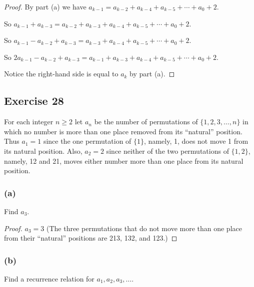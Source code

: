 \documentclass[14pt]{extarticle}
\begin{document}
\begin{proof}
     By part (a) we have \(a_{k-1} = a_{k-2} + a_{k-4} + a_{k-5} + \cdots + a_0 + 2\).

     So \(a_{k-1} + a_{k-3} = a_{k-2} + a_{k-3} + a_{k-4} + a_{k-5} + \cdots + a_0 + 2\).

     So \(a_{k-1} - a_{k-2} + a_{k-3} = a_{k-3} + a_{k-4} + a_{k-5} + \cdots + a_0 + 2\).

     So \(2a_{k-1} - a_{k-2} + a_{k-3} = a_{k-1} + a_{k-3} + a_{k-4} + a_{k-5} + \cdots + a_0 + 2\).

     Notice the right-hand side is equal to \(a_k\) by part (a).
\end{proof}

\subsection{Exercise 28}
For each integer \(n \geq 2\) let \(a_n\) be the number of permutations of \(\{1, 2, 3, \ldots, n\}\) in which no
number is more than one place removed from its “natural” position. Thus \(a_1 = 1\) since the one permutation of
\(\{1\}\), namely, 1, does not move 1 from its natural position. Also, \(a_2 = 2\) since neither of the two
permutations of \(\{1, 2\}\), namely, 12 and 21, moves either number more than one place from its natural position.

\subsubsection{(a)}
Find \(a_3\).

\begin{proof}
     \(a_3 = 3\) (The three permutations that do not move more than one place from their “natural” positions are 213, 132,
     and 123.)
\end{proof}

\subsubsection{(b)}
Find a recurrence relation for \(a_1, a_2, a_3, \ldots\).
\end{document}
